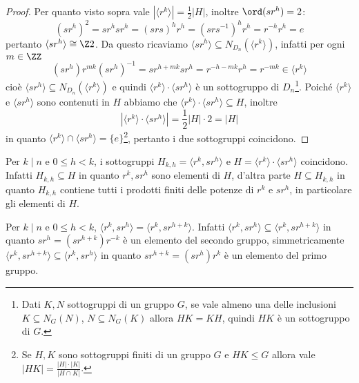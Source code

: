 \documentclass[11pt]{scrartcl}
\begin{document}
\begin{proof}
    Per quanto visto sopra vale $|\langle r^k\rangle| = 
    \displaystyle\frac 1 2|H|$, inoltre $\ord(sr^h) = 2$:
    \[
        (sr^h)^2 = sr^hsr^h = (srs)^hr^h = (srs^{-1})^hr^h = r^{-h}r^h = e
    \]
    pertanto $\langle sr^h\rangle \cong \Z2$. Da questo ricaviamo $\langle sr^h\rangle
    \subseteq N_{D_n}(\langle r^k\rangle)$, infatti per ogni $m \in \ZZ$ 
    \[
        (sr^h)r^{mk}(sr^h)^{-1} = sr^{h + mk} sr^h = r^{-h-mk}r^h = r^{-mk}
        \in \langle r^k \rangle
    \]
    cioè $\langle sr^h\rangle \subseteq N_{D_n}(\langle r^k\rangle)$ e quindi
    $\langle r^k\rangle\cdot\langle sr^h\rangle$ è un sottogruppo di $D_n$\footnote
    {Dati $K, N$ sottogruppi
    di un gruppo $G$, se vale almeno una delle inclusioni $K \subseteq N_G(N)$,
    $N \subseteq N_G(K)$ allora $HK = KH$, quindi $HK$ è un sottogruppo di $G$.}.
    Poiché $\langle r^k\rangle$ e $\langle sr^h\rangle$ sono contenuti in $H$
    abbiamo che $\langle r^k\rangle\cdot\langle sr^h\rangle \subseteq H$, inoltre
    \[|\langle r^k\rangle\cdot\langle sr^h\rangle| = \displaystyle\frac 1 2 |H|\cdot 2 = |H|\]
    in quanto $\langle r^k\rangle\cap\langle sr^h\rangle = \{e\}$\footnote{
        Se $H, K$ sono sottogruppi finiti di un gruppo $G$ e $HK\leqslant G$ allora
        vale $|HK| = \displaystyle\frac{|H|\cdot|K|}{|H\cap K|}$.
    }, pertanto 
    i due sottogruppi coincidono.
\end{proof}

\begin{remark}
    Per $k \mid n$ e $0\leq h < k$, i sottogruppi $H_{k, h} = \langle r^k, sr^h\rangle$
    e $H = \langle r^k\rangle\cdot\langle sr^h\rangle$ coincidono. Infatti 
    $H_{k, h}\subseteq H$ in quanto $r^k, sr^h$ sono elementi di $H$, 
    d'altra parte $H \subseteq H_{k, h}$ in quanto $H_{k, h}$ contiene tutti i 
    prodotti finiti delle potenze di $r^k$ e $sr^h$, in particolare gli elementi di $H$.
\end{remark}

\begin{remark}
    Per $k \mid n$ e $0\leq h < k$, $\langle r^k, sr^h\rangle = 
    \langle r^k, sr^{h + k}\rangle$. Infatti $\langle r^k, sr^h\rangle \subseteq
    \langle r^k, sr^{h + k}\rangle$ in quanto $sr^h = (sr^{h + k})r^{-k}$ è
    un elemento del secondo gruppo, simmetricamente $\langle r^k, sr^{h + k}\rangle
    \subseteq \langle r^k, sr^h\rangle$ in quanto $sr^{h + k} = (sr^h)r^k$ è un
    elemento del primo gruppo.
\end{remark}
\end{document}
